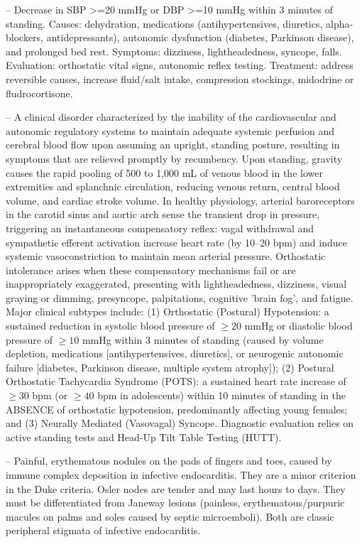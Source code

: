 -- Decrease in SBP >=20 mmHg or DBP >=10 mmHg within 3 minutes of standing. Causes: dehydration, medications (antihypertensives, diuretics, alpha-blockers, antidepressants), autonomic dysfunction (diabetes, Parkinson disease), and prolonged bed rest. Symptoms: dizziness, lightheadedness, syncope, falls. Evaluation: orthostatic vital signs, autonomic reflex testing. Treatment: address reversible causes, increase fluid/salt intake, compression stockings, midodrine or fludrocortisone.

-- A clinical disorder characterized by the inability of the cardiovascular and autonomic regulatory systems to maintain adequate systemic perfusion and cerebral blood flow upon assuming an upright, standing posture, resulting in symptoms that are relieved promptly by recumbency. Upon standing, gravity causes the rapid pooling of 500 to 1,000 mL of venous blood in the lower extremities and splanchnic circulation, reducing venous return, central blood volume, and cardiac stroke volume. In healthy physiology, arterial baroreceptors in the carotid sinus and aortic arch sense the transient drop in pressure, triggering an instantaneous compensatory reflex: vagal withdrawal and sympathetic efferent activation increase heart rate (by 10--20 bpm) and induce systemic vasoconstriction to maintain mean arterial pressure. Orthostatic intolerance arises when these compensatory mechanisms fail or are inappropriately exaggerated, presenting with lightheadedness, dizziness, visual graying or dimming, presyncope, palpitations, cognitive 'brain fog', and fatigue. Major clinical subtypes include: (1) Orthostatic (Postural) Hypotension: a sustained reduction in systolic blood pressure of $\ge 20$ mmHg or diastolic blood pressure of $\ge 10$ mmHg within 3 minutes of standing (caused by volume depletion, medications [antihypertensives, diuretics], or neurogenic autonomic failure [diabetes, Parkinson disease, multiple system atrophy]); (2) Postural Orthostatic Tachycardia Syndrome (POTS): a sustained heart rate increase of $\ge 30$ bpm (or $\ge 40$ bpm in adolescents) within 10 minutes of standing in the ABSENCE of orthostatic hypotension, predominantly affecting young females; and (3) Neurally Mediated (Vasovagal) Syncope. Diagnostic evaluation relies on active standing tests and Head-Up Tilt Table Testing (HUTT).

-- Painful, erythematous nodules on the pads of fingers and toes, caused by immune complex deposition in infective endocarditis. They are a minor criterion in the Duke criteria. Osler nodes are tender and may last hours to days. They must be differentiated from Janeway lesions (painless, erythematous/purpuric macules on palms and soles caused by septic microemboli). Both are classic peripheral stigmata of infective endocarditis.

